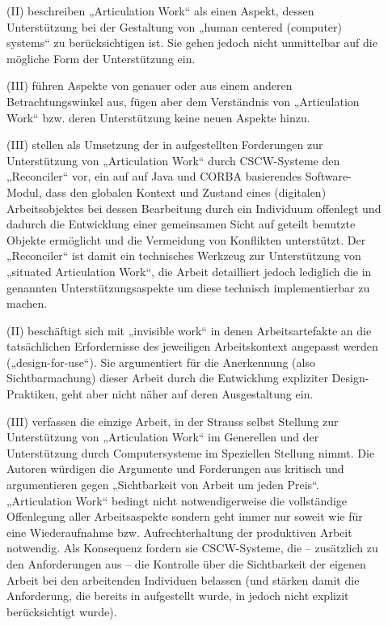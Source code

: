 \begin{description}
	\item[\citet{Kling98}] (II) beschreiben „Articulation Work“ als einen Aspekt, dessen Unterstützung bei der Gestaltung von „human centered (computer) systems“ zu berücksichtigen ist. Sie gehen jedoch nicht unmittelbar auf die mögliche Form der Unterstützung ein.
	\item[\citet{Carstensen99}] (III) führen Aspekte von \citep{Schmidt96} genauer oder aus einem anderen Betrachtungswinkel aus, fügen aber dem Verständnis von „Articulation Work“ bzw. deren Unterstützung keine neuen Aspekte hinzu.
	\item[\citet{Simone99}] (III) stellen als Umsetzung der in \citep{Schmidt96} aufgestellten Forderungen zur Unterstützung von „Articulation Work“ durch \gls{CSCW}-Systeme den „Reconciler“ vor, ein auf auf Java und \gls{CORBA} basierendes Software-Modul, dass den globalen Kontext und Zustand eines (digitalen) Arbeitsobjektes bei dessen Bearbeitung durch ein Individuum offenlegt und dadurch die Entwicklung einer gemeinsamen Sicht auf geteilt benutzte Objekte ermöglicht und die Vermeidung von Konflikten unterstützt. Der „Reconciler“ ist damit ein technisches Werkzeug zur Unterstützung von „situated Articulation Work“, die Arbeit detailliert jedoch lediglich die in \citep{Schmidt96} genannten Unterstützungsaspekte um diese technisch implementierbar zu machen.
	\item[\citet{Suchman99}] (II) beschäftigt sich mit „invisible work“ in denen Arbeitsartefakte an die tatsächlichen Erfordernisse des jeweiligen Arbeitskontext angepasst werden („design-for-use“). Sie argumentiert für die Anerkennung (also Sichtbarmachung) dieser Arbeit durch die Entwicklung expliziter Design-Praktiken, geht aber nicht näher auf deren Ausgestaltung ein.
	\item[\citet{Star99}] (III) verfassen die einzige Arbeit, in der Strauss selbst Stellung zur Unterstützung von „Articulation Work“ im Generellen und der Unterstützung durch Computersysteme im Speziellen Stellung nimmt. Die Autoren  würdigen die Argumente und Forderungen aus \citep{Schmidt96} kritisch und argumentieren gegen „Sichtbarkeit von Arbeit um jeden Preis“.  „Articulation Work“ bedingt nicht notwendigerweise die vollständige Offenlegung aller Arbeitsaspekte sondern geht immer nur soweit wie für eine Wiederaufnahme bzw. Aufrechterhaltung der produktiven Arbeit notwendig. Als Konsequenz fordern sie \gls{CSCW}-Systeme, die -- zusätzlich zu den Anforderungen aus \citep{Schmidt96} -- die Kontrolle über die Sichtbarkeit der eigenen Arbeit bei den arbeitenden Individuen belassen (und stärken damit die Anforderung, die bereits in \citep{Schmidt92} aufgestellt wurde, in \citep{Schmidt96} jedoch nicht explizit berücksichtigt wurde).

\end{description}
